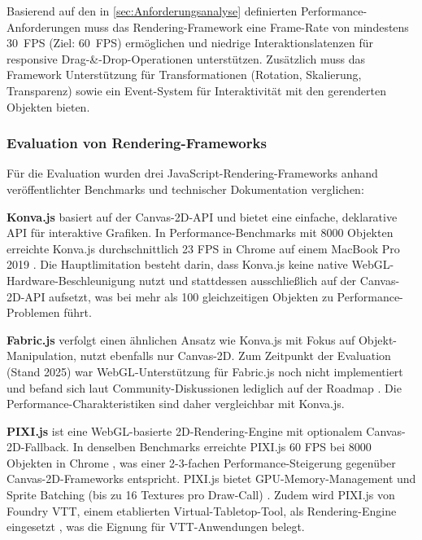 Basierend auf den in \autoref{sec:Anforderungsanalyse} definierten Performance-Anforderungen muss das Rendering-Framework eine Frame-Rate von mindestens 30~\ac{FPS} (Ziel: 60~\ac{FPS}) ermöglichen und niedrige Interaktionslatenzen für responsive Drag-\&-Drop-Operationen unterstützen. Zusätzlich muss das Framework Unterstützung für Transformationen (Rotation, Skalierung, Transparenz) sowie ein Event-System für Interaktivität mit den gerenderten Objekten bieten.

\subsubsection{Evaluation von Rendering-Frameworks}

Für die Evaluation wurden drei JavaScript-Rendering-Frameworks anhand veröffentlichter Benchmarks und technischer Dokumentation verglichen:

\textbf{Konva.js} basiert auf der Canvas-2D-\ac{API} und bietet eine einfache, deklarative \ac{API} für interaktive Grafiken. In Performance-Benchmarks mit 8000 Objekten erreichte Konva.js durchschnittlich 23 \ac{FPS} in Chrome auf einem MacBook Pro 2019 \autocite{Canvas2025}. Die Hauptlimitation besteht darin, dass Konva.js keine native \ac{WebGL}-Hardware-Beschleunigung nutzt und stattdessen ausschließlich auf der Canvas-2D-\ac{API} aufsetzt, was bei mehr als 100 gleichzeitigen Objekten zu Performance-Problemen führt.

\textbf{Fabric.js} verfolgt einen ähnlichen Ansatz wie Konva.js mit Fokus auf Objekt-Manipulation, nutzt ebenfalls nur Canvas-2D. Zum Zeitpunkt der Evaluation (Stand 2025) war \ac{WebGL}-Unterstützung für Fabric.js noch nicht implementiert und befand sich laut Community-Diskussionen lediglich auf der Roadmap \autocite{FabricJSWebGL2025}. Die Performance-Charakteristiken sind daher vergleichbar mit Konva.js.

\textbf{PIXI.js} ist eine \ac{WebGL}-basierte 2D-Rendering-Engine mit optionalem Canvas-2D-Fallback. In denselben Benchmarks erreichte PIXI.js 60 \ac{FPS} bei 8000 Objekten in Chrome \autocite{Canvas2025}, was einer 2-3-fachen Performance-Steigerung gegenüber Canvas-2D-Frameworks entspricht. PIXI.js bietet \ac{GPU}-Memory-Management und Sprite Batching (bis zu 16 Textures pro Draw-Call) \autocite{PixiPerf2024}. Zudem wird PIXI.js von Foundry \ac{VTT}, einem etablierten Virtual-Tabletop-Tool, als Rendering-Engine eingesetzt \autocite{FoundryFrameworks2024}, was die Eignung für \ac{VTT}-Anwendungen belegt.

